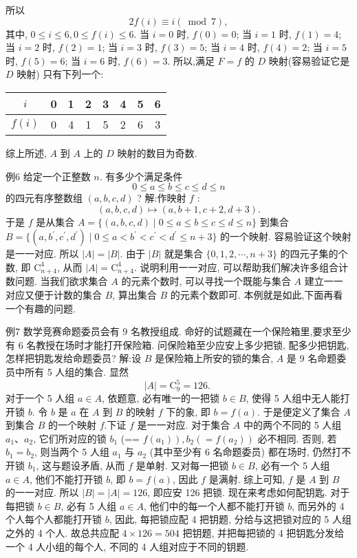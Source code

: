 所以
$$
2 f(i) \equiv i(\bmod 7),
$$
其中, $0 \leqslant i \leqslant 6,0 \leqslant f(i) \leqslant 6$.
当 $i=0$ 时, $f(0)=0$; 当 $i=1$ 时, $f(1)=4$;
当 $i=2$ 时, $f(2)=1$; 当 $i=3$ 时, $f(3)=5$;
当 $i=4$ 时, $f(4)=2$; 当 $i=5$ 时, $f(5)=6$;
当 $i=6$ 时, $f(6)=3$.
所以,满足 $F=f$ 的 $D$ 映射(容易验证它是 $D$ 映射) 只有下列一个:
\begin{tabular}{|c|c|c|c|c|c|c|c|}
\hline$i$ & 0 & 1 & 2 & 3 & 4 & 5 & 6 \\
\hline$f(i)$ & 0 & 4 & 1 & 5 & 2 & 6 & 3 \\
\hline
\end{tabular}
综上所述, $A$ 到 $A$ 上的 $D$ 映射的数目为奇数.



例6 给定一个正整数 $n$. 有多少个满足条件
$$
0 \leqslant a \leqslant b \leqslant c \leqslant d \leqslant n
$$
的四元有序整数组 $(a, b, c, d)$ ?
解:作映射 $f$ :
$$
(a, b, c, d) \mapsto(a, b+1, c+2, d+3) .
$$
于是 $f$ 是从集合 $A=\{(a, b, c, d) \mid 0 \leqslant a \leqslant b \leqslant c \leqslant d \leqslant n\}$ 到集合 $B=\{(a,b^{\prime}, c^{\prime}, d^{\prime}) \mid 0 \leqslant a<b^{\prime}<c^{\prime}<d^{\prime} \leqslant n+3 \}$ 的一个映射.
容易验证这个映射是一一对应.
所以 $|A|=|B|$.
由于 $|B|$ 就是集合 $\{0,1,2, \cdots, n+3\}$ 的四元子集的个数, 即 $\mathrm{C}_{n+4}^4$, 从而 $|A|=\mathrm{C}_{n+4}^4$.
说明利用一一对应, 可以帮助我们解决许多组合计数问题.
当我们欲求集合 $A$ 的元素个数时, 可以寻找一个既能与集合 $A$ 建立一一对应又便于计数的集合 $B$, 算出集合 $B$ 的元素个数即可.
本例就是如此,下面再看一个有趣的问题.



例7 数学竞赛命题委员会有 9 名教授组成.
命好的试题藏在一个保险箱里,要求至少有 6 名教授在场时才能打开保险箱.
问保险箱至少应安上多少把锁, 配多少把钥匙,怎样把钥匙发给命题委员?
解:设 $B$ 是保险箱上所安的锁的集合, $A$ 是 9 名命题委员中所有 5 人组的集合.
显然
$$
|A|=\mathrm{C}_9^5=126 \text {. }
$$
对于一个 5 人组 $a \in A$, 依题意, 必有唯一的一把锁 $b \in B$, 使得 5 人组中无人能打开锁 $b$. 令 $b$ 是 $a$ 在 $A$ 到 $B$ 的映射 $f$ 下的象, 即 $b=f(a)$. 于是便定义了集合 $A$ 到集合 $B$ 的一个映射 $f$.下证 $f$ 是一一对应.
对于集合 $A$ 中的两个不同的 5 人组 $a_1 、 a_2$, 它们所对应的锁 $b_1$ (== $\left.f\left(a_1\right)\right), b_2\left(=f\left(a_2\right)\right)$ 必不相同.
否则, 若 $b_1=b_2$, 则当两个 5 人组 $a_1$ 与 $a_2$ (其中至少有 6 名命题委员) 都在场时, 仍然打不开锁 $b_1$, 这与题设矛盾, 从而 $f$ 是单射.
又对每一把锁 $b \in B$, 必有一个 5 人组 $a \in A$, 他们不能打开锁 $b$, 即 $b= f(a)$, 因此 $f$ 是满射.
综上可知, $f$ 是 $A$ 到 $B$ 的一一对应.
所以 $|B|=|A|=126$, 即应安 126 把锁.
现在来考虑如何配钥匙.
对于每把锁 $b \in B$, 必有 5 人组 $a \in A$, 他们中的每一个人都不能打开锁 $b$, 而另外的 4 个人每个人都能打开锁 $b$, 因此, 每把锁应配 4 把钥题, 分给与这把锁对应的 5 人组之外的 4 个人.
故总共应配 $4 \times 126=504$ 把钥题, 并把每把锁的 4 把钥匙分发给一个 4 人小组的每个人, 不同的 4 人组对应于不同的钥题.



